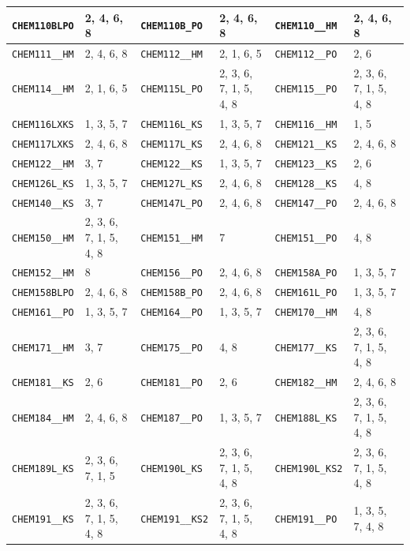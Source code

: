 \begin{longtable}{|l|l||l|l||l|l|}
    \verb|CHEM110BLPO| & 2, 4, 6, 8 & \verb|CHEM110B_PO| & 2, 4, 6, 8 & \verb|CHEM110__HM| & 2, 4, 6, 8\\\hline
    \verb|CHEM111__HM| & 2, 4, 6, 8 & \verb|CHEM112__HM| & 2, 1, 6, 5 & \verb|CHEM112__PO| & 2, 6\\\hline
    \verb|CHEM114__HM| & 2, 1, 6, 5 & \verb|CHEM115L_PO| & 2, 3, 6, 7, 1, 5, 4, 8 & \verb|CHEM115__PO| & 2, 3, 6, 7, 1, 5, 4, 8\\\hline
    \verb|CHEM116LXKS| & 1, 3, 5, 7 & \verb|CHEM116L_KS| & 1, 3, 5, 7 & \verb|CHEM116__HM| & 1, 5\\\hline
    \verb|CHEM117LXKS| & 2, 4, 6, 8 & \verb|CHEM117L_KS| & 2, 4, 6, 8 & \verb|CHEM121__KS| & 2, 4, 6, 8\\\hline
    \verb|CHEM122__HM| & 3, 7 & \verb|CHEM122__KS| & 1, 3, 5, 7 & \verb|CHEM123__KS| & 2, 6\\\hline
    \verb|CHEM126L_KS| & 1, 3, 5, 7 & \verb|CHEM127L_KS| & 2, 4, 6, 8 & \verb|CHEM128__KS| & 4, 8\\\hline
    \verb|CHEM140__KS| & 3, 7 & \verb|CHEM147L_PO| & 2, 4, 6, 8 & \verb|CHEM147__PO| & 2, 4, 6, 8\\\hline
    \verb|CHEM150__HM| & 2, 3, 6, 7, 1, 5, 4, 8 & \verb|CHEM151__HM| & 7 & \verb|CHEM151__PO| & 4, 8\\\hline
    \verb|CHEM152__HM| & 8 & \verb|CHEM156__PO| & 2, 4, 6, 8 & \verb|CHEM158A_PO| & 1, 3, 5, 7\\\hline
    \verb|CHEM158BLPO| & 2, 4, 6, 8 & \verb|CHEM158B_PO| & 2, 4, 6, 8 & \verb|CHEM161L_PO| & 1, 3, 5, 7\\\hline
    \verb|CHEM161__PO| & 1, 3, 5, 7 & \verb|CHEM164__PO| & 1, 3, 5, 7 & \verb|CHEM170__HM| & 4, 8\\\hline
    \verb|CHEM171__HM| & 3, 7 & \verb|CHEM175__PO| & 4, 8 & \verb|CHEM177__KS| & 2, 3, 6, 7, 1, 5, 4, 8\\\hline
    \verb|CHEM181__KS| & 2, 6 & \verb|CHEM181__PO| & 2, 6 & \verb|CHEM182__HM| & 2, 4, 6, 8\\\hline
    \verb|CHEM184__HM| & 2, 4, 6, 8 & \verb|CHEM187__PO| & 1, 3, 5, 7 & \verb|CHEM188L_KS| & 2, 3, 6, 7, 1, 5, 4, 8\\\hline
    \verb|CHEM189L_KS| & 2, 3, 6, 7, 1, 5 & \verb|CHEM190L_KS| & 2, 3, 6, 7, 1, 5, 4, 8 & \verb|CHEM190L_KS2| & 2, 3, 6, 7, 1, 5, 4, 8\\\hline
    \verb|CHEM191__KS| & 2, 3, 6, 7, 1, 5, 4, 8 & \verb|CHEM191__KS2| & 2, 3, 6, 7, 1, 5, 4, 8 & \verb|CHEM191__PO| & 1, 3, 5, 7, 4, 8\\\hline

\end{longtable}
